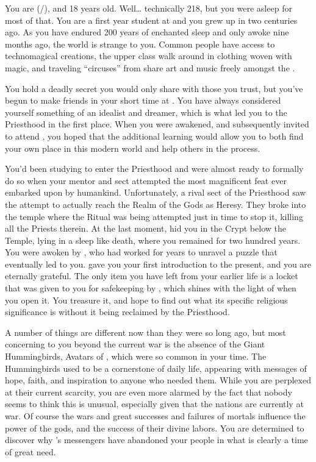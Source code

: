 \documentclass[char]{GL2020}
\begin{document}
\name{\cDisney{}}


You are \cDisney{} (\cDisney{\they}/\cDisney{\them}), and 18 years old. Well… technically 218, but you were asleep for most of that. You are a first year student at \pSchool{} and you grew up in \pFarm{} two centuries ago. As you have endured 200 years of enchanted sleep and only awoke nine months ago, the world is strange to you.  Common people have access to technomagical creations, the upper class walk around in clothing woven with magic, and traveling “circuses” from \pTech{} share art and music freely amongst the \pFarmers{}.

You hold a deadly secret you would only share with those you trust, but you’ve begun to make friends in your short time at \pSchool{}. You have always considered yourself something of an idealist and dreamer, which is what led you to the Priesthood in the first place.  When you were awakened, and subsequently invited to attend \pSchool{}, you hoped that the additional learning would allow you to both find your own place in this modern world and help others in the process.

You’d been studying to enter the Priesthood and were almost ready to formally do so when your mentor \cDisneyMentor{} and \cDisneyMentor{\their} sect attempted the most magnificent feat ever embarked upon by humankind.  Unfortunately, a rival sect of the Priesthood saw the attempt to actually reach the Realm of the Gods as Heresy.  They broke into the temple where the Ritual was being attempted just in time to stop it, killing all the Priests therein.  At the last moment, \cDisneyMentor{} hid you in the Crypt below the Temple, lying in a sleep like death, where you remained for two hundred years.  You were awoken by \cWildCard{}, who had worked for years to unravel a puzzle that eventually led \cWildCard{\them} to you. \cWildCard{} gave you your first introduction to the present, and you are eternally grateful. The only item you have left from your earlier life is a locket that was given to you for safekeeping by \cDisneyMentor{}, which shines with the light of \cFarmGod{} when you open it. You treasure it, and hope to find out what its specific religious significance is without it being reclaimed by the Priesthood.

A number of things are different now than they were so long ago, but most concerning to you beyond the current war is the absence of the Giant Hummingbirds, Avatars of \cFarmGod{}, which were so common in your time. The Hummingbirds used to be a cornerstone of daily life, appearing with messages of hope, faith, and inspiration to anyone who needed them. While you are perplexed at their current scarcity, you are even more alarmed by the fact that nobody seems to think this is unusual, especially given that the nations are currently at war. Of course the wars and great successes and failures of mortals influence the power of the gods, and the success of their divine labors. You are determined to discover why \cFarmGod{}’s messengers have abandoned your people in what is clearly a time of great need.
\end{document}
